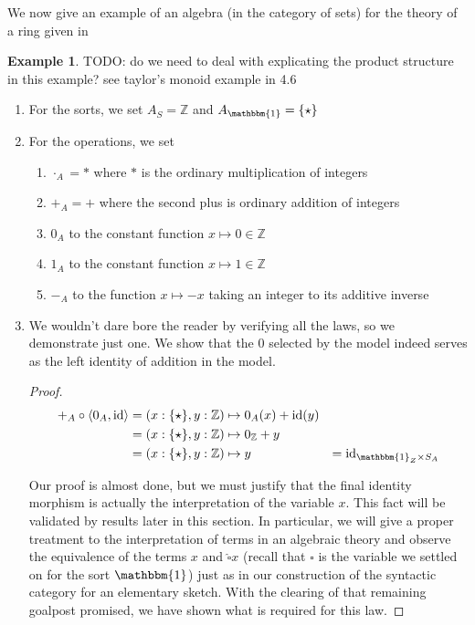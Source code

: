 \documentclass[12pt,twoside]{reedthesis}
\theoremstyle{definition}
\newtheorem{example}{Example}
\theoremstyle{remark}
\theoremstyle{theorem}
\begin{document}
We now give an example of an algebra (in the category of sets) for the theory of
a ring given in
\begin{example}\label{ex:integer ring}
  TODO: do we need to deal with explicating the product structure in this
  example? see taylor's monoid example in 4.6
  \begin{enumerate}
    \item For the sorts, we set $A_{S} = \mathbb{Z}$ and $A_{\mathbbm{1}} = \{\star\}$
    \item For the operations, we set
    \begin{enumerate}
      \item $\cdot_A = *$ where $*$ is the ordinary multiplication of integers
      \item $+_{A} = +$ where the second plus is ordinary addition of integers
      \item $0_{A}$ to the constant function $x \mapsto 0 \in \mathbb{Z}$
      \item $1_{A}$ to the constant function $x \mapsto 1 \in \mathbb{Z}$
      \item $-_{A}$ to the function $x \mapsto -x$ taking an integer to its additive inverse
    \end{enumerate}
    \item We wouldn't dare bore the reader by verifying all the laws, so we
          demonstrate just one. We show that the $0$ selected by the model
          indeed serves as the left identity of addition in the model.
          \begin{proof}
            \begin{align*}
              +_{A} \circ \braket{0_{A}, \id} &= (x : \{ \star \}, y : \mathbb{Z}) \mapsto 0_{A}(x) + \id(y)\\
                                          &= (x : \{ \star \}, y : \mathbb{Z}) \mapsto 0_{\mathbb{Z}} + y \\
                                          &= (x : \{ \star \}, y : \mathbb{Z}) \mapsto y
                                          &= \id_{\mathbbm{1}_{Z} \times S_{A}} \\
            \end{align*}

            Our proof is almost done, but we must justify that the final
            identity morphism is actually the interpretation of the variable
            $x$. This fact will be validated by results later in this section.
            In particular, we will give a proper treatment to the interpretation
            of terms in an algebraic theory and observe the equivalence of the
            terms $x$ and $\hat{\square} x$ (recall that $\square$ is the variable we
            settled on for the sort $\mathbbm{1}$) just as in our construction
            of the syntactic category for an elementary sketch. With the
            clearing of that remaining goalpost promised, we have shown what is
            required for this law.
          \end{proof}
  \end{enumerate}
\end{example}
\end{document}
